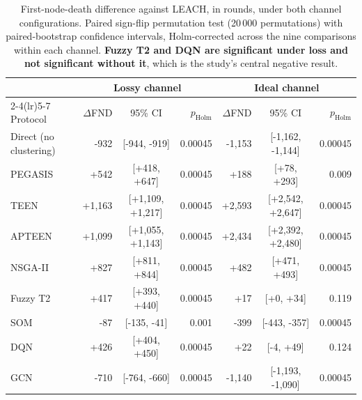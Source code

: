 \begin{table}[!t]
\caption{First-node-death difference against LEACH, in rounds, under both channel configurations. Paired sign-flip permutation test (20\,000 permutations) with paired-bootstrap confidence intervals, Holm-corrected across the nine comparisons within each channel. \textbf{Fuzzy T2 and DQN are significant under loss and not significant without it}, which is the study's central negative result.}
\label{tab:paired-fnd}
\centering
\begin{tabular}{lrcrrcr}
\toprule
& \multicolumn{3}{c}{Lossy channel} & \multicolumn{3}{c}{Ideal channel} \\
\cmidrule(lr){2-4}\cmidrule(lr){5-7}
Protocol & $\Delta$FND & 95\% CI & $p_{\mathrm{Holm}}$ & $\Delta$FND & 95\% CI & $p_{\mathrm{Holm}}$ \\
\midrule
Direct (no clustering) & -932 & [-944, -919] & 0.00045 & -1,153 & [-1,162, -1,144] & 0.00045 \\
PEGASIS & +542 & [+418, +647] & 0.00045 & +188 & [+78, +293] & 0.009 \\
TEEN & +1,163 & [+1,109, +1,217] & 0.00045 & +2,593 & [+2,542, +2,647] & 0.00045 \\
APTEEN & +1,099 & [+1,055, +1,143] & 0.00045 & +2,434 & [+2,392, +2,480] & 0.00045 \\
NSGA-II & +827 & [+811, +844] & 0.00045 & +482 & [+471, +493] & 0.00045 \\
Fuzzy T2 & +417 & [+393, +440] & 0.00045 & +17 & [+0, +34] & 0.119 \\
SOM & -87 & [-135, -41] & 0.001 & -399 & [-443, -357] & 0.00045 \\
DQN & +426 & [+404, +450] & 0.00045 & +22 & [-4, +49] & 0.124 \\
GCN & -710 & [-764, -660] & 0.00045 & -1,140 & [-1,193, -1,090] & 0.00045 \\
\bottomrule
\end{tabular}
\end{table}
